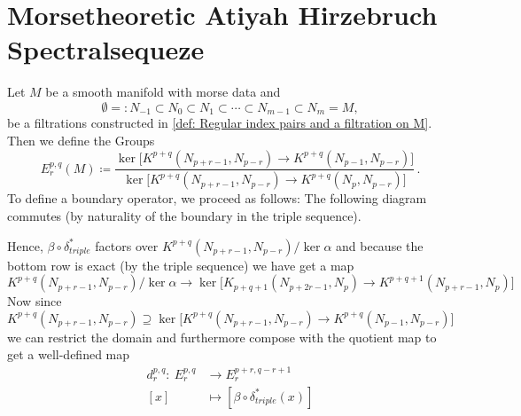 \section{Morsetheoretic Atiyah Hirzebruch Spectralsequeze}


\begin{definition} Let $M$ be a smooth manifold with morse data and \begin{equation*}
    \emptyset=:N_{-1}\subset N_0\subset N_1\subset \cdots \subset N_{m-1}\subset N_m=M,
\end{equation*} be a filtrations constructed in \ref{def: Regular index pairs and a filtration on M}. Then we define the Groups
    \begin{equation*}
        E^{p,q}_r(M)\coloneq \frac{\ker\big[K^{p+q}(N_{p+r-1},N_{p-r})\to K^{p+q}(N_{p-1},N_{p-r})  \big]}{\ker\big[K^{p+q}(N_{p+r-1},N_{p-r})\to K^{p+q}(N_{p},N_{p-r})\big]} \, .
    \end{equation*} To define a boundary operator, we proceed as follows:
    The following diagram commutes (by naturality of the boundary in the triple sequence).
    \begin{center}
\end{center} Hence, $\beta\circ \delta^*_{triple}$ factors over ${K^{p+q}(N_{p+r-1},N_{p-r})}\slash \ker \alpha$ and because the bottom row is exact (by the triple sequence) we have get a map 
\begin{equation*}
    {K^{p+q}(N_{p+r-1},N_{p-r})}\slash \ker \alpha \to \ker\big[K_{p+q+1}(N_{p+2r-1},N_{p})\to K^{p+q+1}(N_{p+r-1},N_{p})  \big]
\end{equation*} Now since ${K^{p+q}(N_{p+r-1},N_{p-r})}\supseteq \ker\big[K^{p+q}(N_{p+r-1},N_{p-r})\to K^{p+q}(N_{p-1},N_{p-r})  \big]$ we can restrict the domain and furthermore compose with the quotient map to get a well-defined map
\begin{align*}
    d_r^{p,q}: ~E^{p,q}_r &  \to E^{p+r,q-r+1}_{r}\\
    [x]                   &  \mapsto [\beta\circ \delta^*_{triple}(x)]
\end{align*}
\end{definition}
